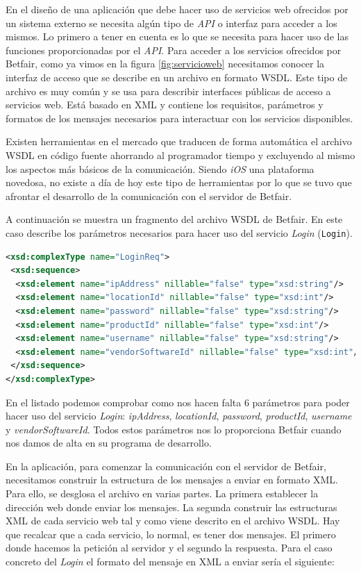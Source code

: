   En el diseño de una aplicación que debe hacer uso de servicios web ofrecidos por un sistema externo se necesita algún tipo de \emph{API} o interfaz para acceder a los mismos. Lo primero a tener en cuenta es lo que se necesita para hacer uso de las funciones proporcionadas por el \emph{API}. Para acceder a los servicios ofrecidos por Betfair, como ya vimos en la figura \ref{fig:servicioweb} necesitamos conocer la interfaz de acceso que se describe  en un archivo en formato WSDL. Este tipo de archivo es muy común y se usa para describir interfaces públicas de acceso a servicios web. Está basado en XML y contiene los requisitos, parámetros y formatos de los mensajes necesarios para interactuar con los servicios disponibles. 
   
   Existen herramientas en el mercado que traducen de forma automática el archivo WSDL en código fuente ahorrando al programador tiempo y excluyendo al mismo los aspectos más básicos de la comunicación. Siendo \emph{iOS} una plataforma novedosa, no existe a día de hoy este tipo de herramientas por lo que se tuvo que afrontar el desarrollo de la comunicación con el servidor de Betfair.
      
   A continuación se muestra un fragmento del archivo WSDL de Betfair. En este caso describe los parámetros necesarios para hacer uso del servicio \emph{Login } (\lstinline{Login}).
   
\begin{lstlisting}[language=xml]
<xsd:complexType name="LoginReq">
 <xsd:sequence>
  <xsd:element name="ipAddress" nillable="false" type="xsd:string"/>
  <xsd:element name="locationId" nillable="false" type="xsd:int"/>
  <xsd:element name="password" nillable="false" type="xsd:string"/>
  <xsd:element name="productId" nillable="false" type="xsd:int"/>
  <xsd:element name="username" nillable="false" type="xsd:string"/>
  <xsd:element name="vendorSoftwareId" nillable="false" type="xsd:int"/>
 </xsd:sequence>
</xsd:complexType>
\end{lstlisting}

   En el listado podemos comprobar como nos hacen falta 6 parámetros para poder hacer uso del servicio \emph{Login}: \emph{ipAddress}, \emph{locationId}, \emph{password}, \emph{productId}, \emph{username} y \emph{vendorSoftwareId}. Todos estos parámetros nos lo proporciona Betfair cuando nos damos de alta en su programa de desarrollo.
   
   En la aplicación, para comenzar la comunicación con el servidor de Betfair, necesitamos construir la estructura de los mensajes a enviar en formato XML. Para ello, se desglosa el archivo en varias partes. La primera establecer la dirección web donde enviar los mensajes. La segunda construir las estructuras XML de cada servicio web tal y como viene descrito en el archivo WSDL. Hay que recalcar que a cada servicio, lo normal, es tener dos mensajes. El primero donde hacemos la petición al servidor y el segundo la respuesta. Para el caso concreto del \emph{Login} el formato del mensaje en XML a enviar sería el siguiente:
 
